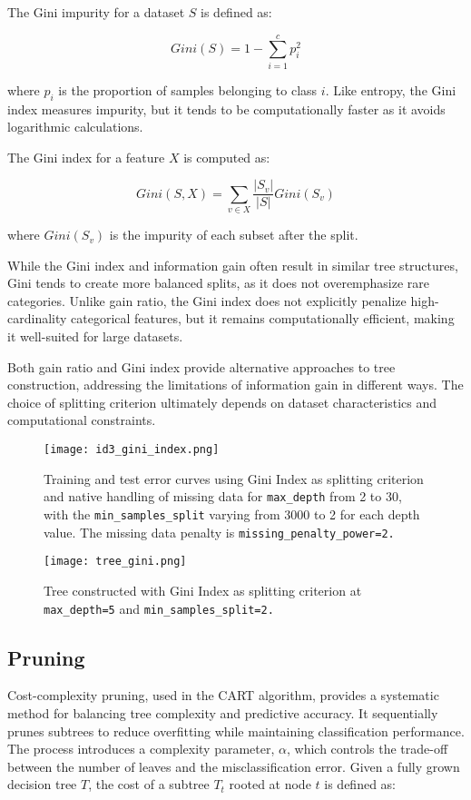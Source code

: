 \documentclass[12pt]{article}
\begin{document}
The Gini impurity for a dataset $S$ is defined as:

\begin{equation}
    Gini(S) = 1 - \sum_{i=1}^{c} p_i^2
\end{equation}

where $p_i$ is the proportion of samples belonging to class $i$. Like entropy, the Gini index measures impurity, but it tends to be computationally faster as it avoids logarithmic calculations.

The Gini index for a feature $X$ is computed as:

\begin{equation}
    Gini(S, X) = \sum_{v \in X} \frac{|S_v|}{|S|} Gini(S_v)
\end{equation}

where $Gini(S_v)$ is the impurity of each subset after the split.

While the Gini index and information gain often result in similar tree structures, Gini tends to create more balanced splits, as it does not overemphasize rare categories. Unlike gain ratio, the Gini index does not explicitly penalize high-cardinality categorical features, but it remains computationally efficient, making it well-suited for large datasets.

Both gain ratio and Gini index provide alternative approaches to tree construction, addressing the limitations of information gain in different ways. The choice of splitting criterion ultimately depends on dataset characteristics and computational constraints.

\begin{figure}[H]
    \centering
    \texttt{[image: id3\_gini\_index.png]}
    \caption{Training and test error curves using Gini Index as splitting criterion and native handling of missing data for \texttt{max\_depth} from 2 to 30, with the \texttt{min\_samples\_split} varying from 3000 to 2 for each depth value. The missing data penalty is  \texttt{missing\_penalty\_power=2.}}
    \label{fig:enter-label}
\end{figure}

\begin{figure}[H]
    \centering
    \texttt{[image: tree\_gini.png]}
    \caption{Tree constructed with Gini Index as splitting criterion at \texttt{max\_depth=5} and \texttt{min\_samples\_split=2.}}
    \label{fig:enter-label}
\end{figure}

\subsection{Pruning}
Cost-complexity pruning, used in the CART algorithm, provides a systematic method for balancing tree complexity and predictive accuracy. It sequentially prunes subtrees to reduce overfitting while maintaining classification performance. The process introduces a complexity parameter, $\alpha$, which controls the trade-off between the number of leaves and the misclassification error.
Given a fully grown decision tree $T$, the cost of a subtree $T_t$ rooted at node $t$ is defined as:
\end{document}
